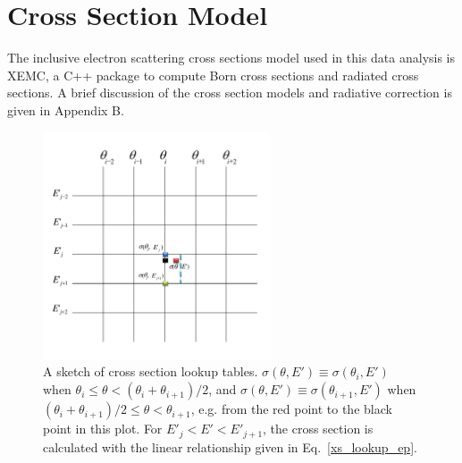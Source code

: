 \section{Cross Section Model}
 The inclusive electron scattering cross sections model used in this data analysis is XEMC, a C++ package to compute Born cross sections and radiated cross sections. A brief discussion of the cross section models and radiative correction is given in Appendix B. 
\begin{figure}[!ht]
  \begin{center}
    \includegraphics[type=pdf, ext=.pdf,read=.pdf,width=0.60\textwidth]{./figures/xemc/LookUp_Table}
    \caption[A sketch of cross section lookup tables]{\footnotesize{A sketch of cross section lookup tables. $\sigma(\theta,E') \equiv \sigma(\theta_{i},E')$ when $\theta_{i}\leq \theta < (\theta_{i}+\theta_{i+1})/2$, and $\sigma(\theta,E') \equiv \sigma(\theta_{i+1},E')$ when $(\theta_{i}+\theta_{i+1})/2\leq \theta <\theta_{i+1}$, e.g. from the red point to the black point in this plot. For $E'_{j}<E'<E'_{j+1}$, the cross section is calculated with the linear relationship given in Eq.~\eqref{xs_lookup_ep}.}}
    \label{xs_table}
  \end{center}
\end{figure}

